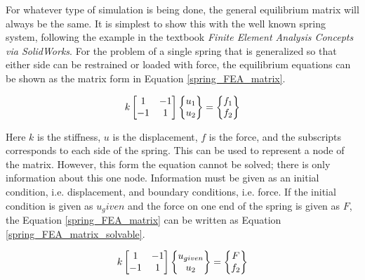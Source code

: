 For whatever type of simulation is being done, the general equilibrium matrix will always be the same. It is simplest to show this with the well known spring system, following the example in the textbook \textit{Finite Element Analysis Concepts via SolidWorks}. For the problem of a single spring that is generalized so that either side can be restrained or loaded with force, the equilibrium equations can be shown as the matrix form in Equation \ref{spring_FEA_matrix}.

\begin{equation} \label{spring_FEA_matrix}
\begingroup
    k
    \begin{bmatrix}
        1 & -1 \\
        -1 & 1
    \end{bmatrix}
    \begin{Bmatrix}
        u_1 \\
        u_2 \\
    \end{Bmatrix}
    =
    \begin{Bmatrix}
        f_1 \\
        f_2 \\
    \end{Bmatrix}
\endgroup
\end{equation}

Here $k$ is the stiffness, $u$ is the displacement, $f$ is the force, and the subscripts corresponds to each side of the spring. This can be used to represent a node of the matrix. However, this form the equation cannot be solved; there is only information about this one node. Information must be given as an initial condition, i.e. displacement, and boundary conditions, i.e. force. If the initial condition is given as $u_given$ and the force on one end of the spring is given as $F$, the Equation \ref{spring_FEA_matrix} can be written as Equation \ref{spring_FEA_matrix_solvable}.

\begin{equation} \label{spring_FEA_matrix_solvable}
\begingroup
    k
    \begin{bmatrix}
        1 & -1 \\
        -1 & 1
    \end{bmatrix}
    \begin{Bmatrix}
        u_{given} \\
        u_2 \\
    \end{Bmatrix}
    =
    \begin{Bmatrix}
        F \\
        f_2 \\
    \end{Bmatrix}
\endgroup
\end{equation}

